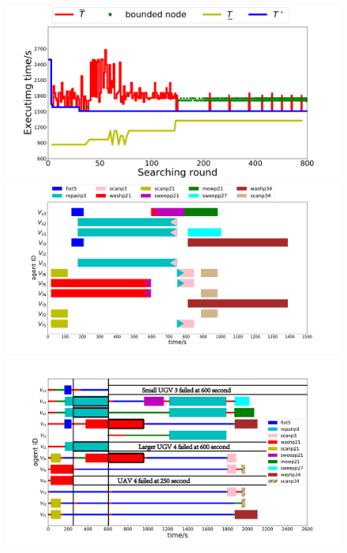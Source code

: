 \begin{figure}[t]
	\begin{minipage}[t]{0.32\linewidth}
		\includegraphics[width = 1.15\textwidth]{figures/simulation/taskfinal/bnb.pdf}
	\end{minipage}%
	\begin{minipage}[t]{0.34\linewidth}
		\includegraphics[height =0.56\textwidth]{figures/simulation/taskfinal/gantt_sim.pdf}
	\end{minipage}%
	\begin{minipage}[t]{0.34\linewidth}
		\includegraphics[height =0.56\textwidth]{figures/simulation/taskfinal/gantt_online_prefix.pdf}

\end{minipage}
\end{figure}
